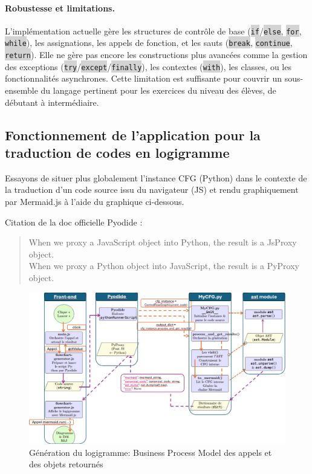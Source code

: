 \documentclass[11pt,a4paper]{article}
\let\cite\parencite
\newcommand{\code}[1]{\colorbox{lightgray}{\texttt{\small #1}}}
\begin{document}
\paragraph{Robustesse et limitations.} L'implémentation actuelle gère les structures de contrôle de base (\code{if}/\code{else}, \code{for}, \code{while}), les assignations, les appels de fonction, et les sauts (\code{break}, \code{continue}, \code{return}). Elle ne gère pas encore les constructions plus avancées comme la gestion des exceptions (\code{try}/\code{except}/\code{finally}), les contextes (\code{with}), les classes, ou les fonctionnalités asynchrones. Cette limitation est suffisante pour couvrir un sous-ensemble du langage pertinent pour les exercices du niveau des élèves, de débutant à intermédiaire.

\subsection{Fonctionnement de l'application pour la traduction de codes en logigramme}

Essayons de situer plus globalement l'instance CFG (Python) dans le contexte de la traduction d'un code source issu du navigateur (JS) et rendu graphiquement par Mermaid.js à l'aide du graphique ci-dessous.

Citation de la doc officielle Pyodide \cite{pyodide}:
\begin{quote}
    When we proxy a JavaScript object into Python, the result is a JsProxy object.\\ When we proxy a Python object into JavaScript, the result is a PyProxy object.
\end{quote}

\begin{landscape}
\begin{figure}
    \centering
    \includegraphics[width=1.3\textwidth]{BPMN_process_logigramme.png}
    \caption{Génération du logigramme: Business Process Model des appels et des objets retournés}
    \label{bpmn}
\end{figure}
\end{landscape}
\end{document}
